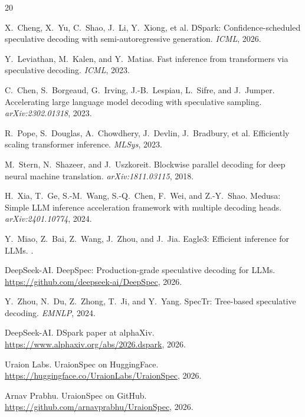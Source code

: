 \documentclass[11pt,a4paper]{article}
\begin{document}

\begin{thebibliography}{20}

X.~Cheng, X.~Yu, C.~Shao, J.~Li, Y.~Xiong, et al.
\newblock DSpark: Confidence-scheduled speculative decoding with
semi-autoregressive generation.
\newblock \textit{ICML}, 2026.

Y.~Leviathan, M.~Kalen, and Y.~Matias.
\newblock Fast inference from transformers via speculative decoding.
\newblock \textit{ICML}, 2023.

C.~Chen, S.~Borgeaud, G.~Irving, J.-B.~Lespiau, L.~Sifre, and
J.~Jumper.
\newblock Accelerating large language model decoding with speculative
sampling.
\newblock \textit{arXiv:2302.01318}, 2023.

R.~Pope, S.~Douglas, A.~Chowdhery, J.~Devlin, J.~Bradbury, et al.
\newblock Efficiently scaling transformer inference.
\newblock \textit{MLSys}, 2023.

M.~Stern, N.~Shazeer, and J.~Uszkoreit.
\newblock Blockwise parallel decoding for deep neural machine translation.
\newblock \textit{arXiv:1811.03115}, 2018.

H.~Xia, T.~Ge, S.-M.~Wang, S.-Q.~Chen, F.~Wei, and Z.-Y.~Shao.
\newblock Medusa: Simple LLM inference acceleration framework with multiple
decoding heads.
\newblock \textit{arXiv:2401.10774}, 2024.

Y.~Miao, Z.~Bai, Z.~Wang, J.~Zhou, and J.~Jia.
\newblock Eagle3: Efficient inference for LLMs.
.

DeepSeek-AI.
\newblock DeepSpec: Production-grade speculative decoding for LLMs.
\newblock \url{https://github.com/deepseek-ai/DeepSpec}, 2026.

Y.~Zhou, N.~Du, Z.~Zhong, T.~Ji, and Y.~Yang.
\newblock SpecTr: Tree-based speculative decoding.
\newblock \textit{EMNLP}, 2024.

DeepSeek-AI.
\newblock DSpark paper at alphaXiv.
\newblock \url{https://www.alphaxiv.org/abs/2026.dspark}, 2026.

Uraion Labs.
\newblock UraionSpec on HuggingFace.
\newblock \url{https://huggingface.co/UraionLabs/UraionSpec}, 2026.

Arnav Prabhu.
\newblock UraionSpec on GitHub.
\newblock \url{https://github.com/arnavprabhu/UraionSpec}, 2026.

\end{thebibliography}
\end{document}
